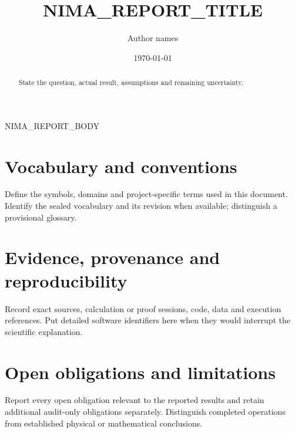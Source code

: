 \documentclass[11pt]{article}
\title{NIMA_REPORT_TITLE}
\author{Author names}
\date{\today}
\begin{document}
\maketitle
\begin{abstract}
State the question, actual result, assumptions and remaining uncertainty.
\end{abstract}

NIMA_REPORT_BODY

\appendix
\section{Vocabulary and conventions}
Define the symbols, domains and project-specific terms used in this document.
Identify the sealed vocabulary and its revision when available; distinguish a provisional glossary.

\section{Evidence, provenance and reproducibility}
Record exact sources, calculation or proof sessions, code, data and execution references.
Put detailed software identifiers here when they would interrupt the scientific explanation.

\section{Open obligations and limitations}
Report every open obligation relevant to the reported results and retain additional audit-only obligations separately.
Distinguish completed operations from established physical or mathematical conclusions.
\end{document}
